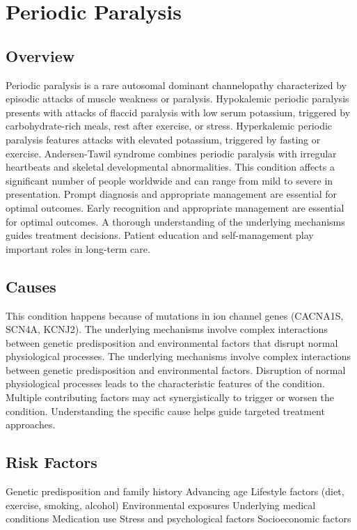 \chapter{Periodic Paralysis}
\label{sec:Periodic Paralysis}

\section{Overview}
Periodic paralysis is a rare autosomal dominant channelopathy characterized by episodic attacks of muscle weakness or paralysis. Hypokalemic periodic paralysis presents with attacks of flaccid paralysis with low serum potassium, triggered by carbohydrate-rich meals, rest after exercise, or stress. Hyperkalemic periodic paralysis features attacks with elevated potassium, triggered by fasting or exercise. Andersen-Tawil syndrome combines periodic paralysis with irregular heartbeats and skeletal developmental abnormalities. This condition affects a significant number of people worldwide and can range from mild to severe in presentation. Prompt diagnosis and appropriate management are essential for optimal outcomes. Early recognition and appropriate management are essential for optimal outcomes. A thorough understanding of the underlying mechanisms guides treatment decisions. Patient education and self-management play important roles in long-term care.
\section{Causes}
This condition happens because of mutations in ion channel genes (CACNA1S, SCN4A, KCNJ2). The underlying mechanisms involve complex interactions between genetic predisposition and environmental factors that disrupt normal physiological processes. The underlying mechanisms involve complex interactions between genetic predisposition and environmental factors. Disruption of normal physiological processes leads to the characteristic features of the condition. Multiple contributing factors may act synergistically to trigger or worsen the condition. Understanding the specific cause helps guide targeted treatment approaches.
\section{Risk Factors}
Genetic predisposition and family history Advancing age Lifestyle factors (diet, exercise, smoking, alcohol) Environmental exposures Underlying medical conditions Medication use Stress and psychological factors Socioeconomic factors

